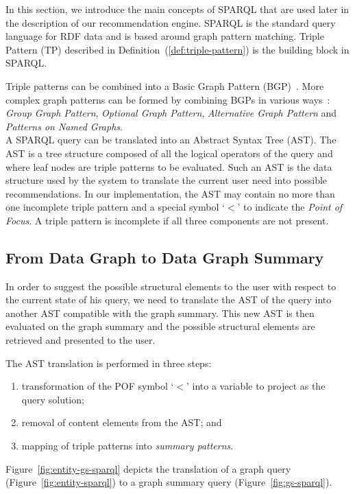 In this section, we introduce the main concepts of SPARQL that are used later in the description of our recommendation engine. SPARQL is the standard query language for RDF data and is based around graph pattern matching. Triple Pattern (TP) described in Definition~(\ref{def:triple-pattern}) is the building block in SPARQL.

Triple patterns can be combined into a Basic Graph Pattern (BGP)~\cite{PrudS08}. More complex graph patterns can be formed by combining BGPs in various ways~\cite{PrudS08}: \emph{Group Graph Pattern}, \emph{Optional Graph Pattern}, \emph{Alternative Graph Pattern} and \emph{Patterns on Named Graphs}.\\

A SPARQL query can be translated into an Abstract Syntax Tree (AST). The AST is a tree structure composed of all the logical operators of the query and where leaf nodes are triple patterns to be evaluated. Such an AST is the data structure used by the system to translate the current user need into possible recommendations. In our implementation, the AST may contain no more than one incomplete triple pattern and a special symbol `$<$' to indicate the \emph{Point of Focus}. A triple pattern is incomplete if all three components are not present.

\subsection{From Data Graph to Data Graph Summary}

In order to suggest the possible structural elements to the user with respect to the current state of his query, we need to translate the AST of the query into another AST compatible with the graph summary. This new AST is then evaluated on the graph summary and the possible structural elements are retrieved and presented to the user.

The AST translation is performed in three steps:
\begin{enumerate}
\item transformation of the POF symbol `$<$' into a variable to project as the query solution;
\item removal of content elements from the AST; and
\item mapping of triple patterns into \emph{summary patterns}.
\end{enumerate}
Figure~\ref{fig:entity-gs-sparql} depicts the translation of a graph query (Figure~\ref{fig:entity-sparql}) to a graph summary query (Figure~\ref{fig:gs-sparql}).

